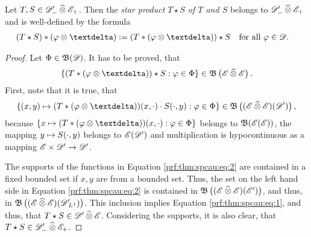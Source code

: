 \begin{theorem}
    \label{thm:spcau}
    Let $ T,S \in \mathscr{  D  }'_- \mathbin{\widehat{\otimes}} \mathscr{  E  }_+ $.
    Then the {\em star product $ T \star S $ of $ T $ and $ S $}
    belongs to $ \mathscr{  D  }'_- \mathbin{\widehat{\otimes}} \mathscr{  E  }_+ $
    and is well-defined by the formula
    \begin{align}
        ( T \star S ) * ( \ph \tepro \sfdeo )
        :=
        ( T * ( \ph \tepro \sfdeo ) ) \star S
        &&&\text{for all $ \ph \in \fsTest $.}
        \label{thm:spcau:eq}
    \end{align}
\end{theorem}
\begin{proof}
    Let $ \Phi \in \operatorname{\mathfrak{ B }}(\mathscr{  D  }) $.
    It has to be proved, that
    \begin{align}
        \BrmSet{ ( T * ( \ph \tepro \sfdeo ) ) \star S }{ \ph \in \Ph }
        \in
        \ssBnd\left( \fsSmo \ctepro \fsSmo \right)
        .
        \label{prf:thm:spcau:eq:1}
    \end{align}
    First, note that it is true, that
    \begin{align}
        \BrmSet{ (x,y) \mto ( T * ( \ph \tepro \sfdeo ) )(x,\cdot) \mult S(\cdot,y) }
        { \ph \in \Ph }
        \in
        \ssBnd\left( ( \fsSmo \ctepro \fsSmo )( \fsDis ) \right)
        ,
        \label{prf:thm:spcau:eq:2}
    \end{align}
    because
    $ \BrmSet{ x \mto ( T * ( \ph \tepro \sfdeo ) )(x,\cdot) }{ \ph \in \Ph } $
    belongs to $ \operatorname{\mathfrak{ B }}( \mathscr{  E  }( \mathscr{  E  } ) ) $,
    the mapping $ y \mapsto S(\cdot,y) $ belongs to $ \mathscr{  E  }( \mathscr{  D  }' ) $ and
    multiplication is hypocontinuous
    as a mapping $ \mathscr{  E  } \times \mathscr{  D  }' \to \mathscr{  D  }' $.

    The supports of the functions in Equation \eqref{prf:thm:spcau:eq:2}
    are contained in a fixed bounded set
    if $ x,y $ are from a bounded set.
    Thus, the set on the left hand side
    in Equation \eqref{prf:thm:spcau:eq:2} is contained
    in $ \operatorname{\mathfrak{ B }}\left( ( \mathscr{  E  } \mathbin{\widehat{\otimes}} \mathscr{  E  } )( \mathscr{  E  }' ) \right) $,
    and thus, in $ \operatorname{\mathfrak{ B }}\left( ( \mathscr{  E  } \mathbin{\widehat{\otimes}} \mathscr{  E  } )( \mathscr{  D  }'\hspace{-2pt}{}_{ L^{ 1 } } ) \right) $.
    This inclusion implies Equation \eqref{prf:thm:spcau:eq:1},
    and thus, that $ T \star S \in \mathscr{  D  }' \mathbin{\widehat{\otimes}} \mathscr{  E  } $.
    Considering the supports, it is also clear,
    that $ T \star S \in \mathscr{  D  }'_- \mathbin{\widehat{\otimes}} \mathscr{  E  }_+ $.
\end{proof}